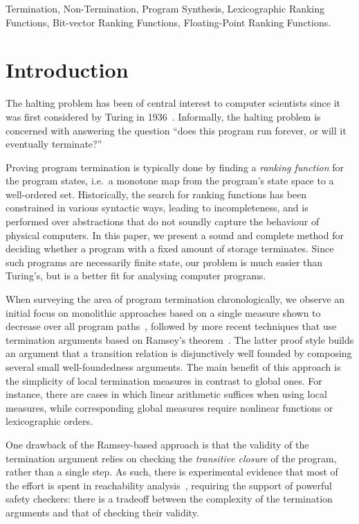 \documentclass[a4paper]{llncs}
\begin{document}

\keywords
Termination, Non-Termination, Program Synthesis,
Lexicographic Ranking Functions, Bit-vector Ranking Functions, Floating-Point Ranking Functions.



\section{Introduction}\label{sec:intro}

The halting problem has been of central interest to computer scientists
since it was first considered by Turing in 1936~\cite{turing}.  Informally,
the halting problem is concerned with answering the question
``does this program run forever, or will it eventually terminate?''

Proving program termination is typically done by finding a \emph{ranking
function} for the program states, i.e.~a monotone map from the program's
state space to a well-ordered set.  Historically, the search for ranking
functions has been constrained in various syntactic ways, leading to
incompleteness, and is performed over abstractions that do not soundly
capture the behaviour of physical computers.  In this paper, we present a
sound and complete method for deciding whether a program with a fixed amount of
storage terminates.  Since such programs are necessarily finite state, our
problem is much easier than Turing's, but is a better fit for analysing computer
programs.

When surveying the area of program termination chronologically, we observe
an initial focus on monolithic approaches based on a single measure shown to
decrease over all program
paths~\cite{DBLP:conf/vmcai/P04,DBLP:conf/cav/BradleyMS05}, followed by more
recent techniques that use termination arguments based on Ramsey's
theorem~\cite{DBLP:conf/lpe/CodishG03,DBLP:conf/lics/PodelskiR04,DBLP:conf/pldi/CookPR06}.
The latter proof style builds an argument that a transition relation is disjunctively well founded
by composing several small well-foundedness arguments.
The main benefit of this approach is
the simplicity of local termination measures in contrast to global ones. 
For instance, there are cases in which linear arithmetic suffices when using
local measures, while corresponding global measures require nonlinear
functions or lexicographic orders.

One drawback of the Ramsey-based approach is that the validity of the
termination argument relies on checking the \emph{transitive closure} of the
program, rather than a single step.  As such, there is experimental evidence
that most of the effort is spent in reachability
analysis~\cite{DBLP:conf/pldi/CookPR06,DBLP:conf/cav/KroeningSTW10},
requiring the support of powerful safety checkers: there is a tradeoff
between the complexity of the termination arguments and that of checking
their validity.
\end{document}
